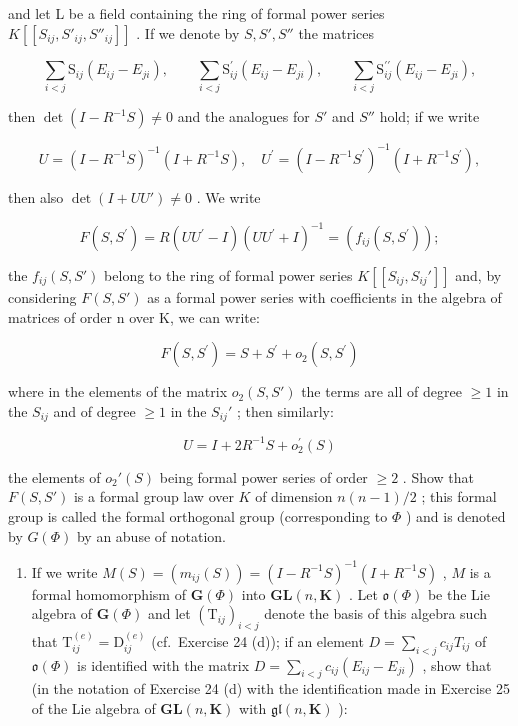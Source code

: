 and let L be a field containing the ring of formal power series \(K[[S_{ij}, S'_{ij}, S''_{ij}]]\) . If we denote by \(S, S', S''\) the matrices

\[
\sum_ {i <   j} \mathrm{S} _ {i j} (E _ {i j} - E _ {j i}), \qquad \sum_ {i <   j} \mathrm{S} _ {i j} ^ {\prime} (E _ {i j} - E _ {j i}), \qquad \sum_ {i <   j} \mathrm{S} _ {i j} ^ {\prime \prime} (E _ {i j} - E _ {j i}),
\]

then \(\operatorname{det}(I - R^{-1}S) \neq 0\) and the analogues for \(S'\) and \(S''\) hold; if we write

\[
U = (I - R ^ {- 1} S) ^ {- 1} (I + R ^ {- 1} S), \quad U ^ {\prime} = (I - R ^ {- 1} S ^ {\prime}) ^ {- 1} (I + R ^ {- 1} S ^ {\prime}),
\]

then also \(\operatorname{det}(I + UU') \neq 0\) . We write

\[
F (S, S ^ {\prime}) = R \left(U U ^ {\prime} - I\right) \left(U U ^ {\prime} + I\right) ^ {- 1} = \left(f _ {i j} \left(S, S ^ {\prime}\right)\right);
\]

the \(f_{ij}(S, S')\) belong to the ring of formal power series \(K[[S_{ij}, S_{ij}']]\) and, by considering \(F(S, S')\) as a formal power series with coefficients in the algebra of matrices of order n over K, we can write:

\[
F (S, S ^ {\prime}) = S + S ^ {\prime} + o _ {2} (S, S ^ {\prime})
\]

where in the elements of the matrix \(o_2(S, S')\) the terms are all of degree \(\geqslant 1\) in the \(S_{ij}\) and of degree \(\geqslant 1\) in the \(S_{ij}'\) ; then similarly:

\[
U = I + 2 R ^ {- 1} S + o _ {2} ^ {\prime} (S)
\]

the elements of \(o_2'(S)\) being formal power series of order \(\geqslant 2\) . Show that \(F(S, S')\) is a formal group law over \(K\) of dimension \(n(n - 1)/2\) ; this formal group is called the formal orthogonal group (corresponding to \(\Phi\) ) and is denoted by \(G(\Phi)\) by an abuse of notation.

\begin{enumerate}
\def\labelenumi{(\alph{enumi})}
\setcounter{enumi}{1}
\tightlist
\item
  If we write \(M(S) = (m_{ij}(S)) = (I - R^{-1}S)^{-1}(I + R^{-1}S)\) , \(M\) is a formal homomorphism of \(\mathbf{G}(\Phi)\) into \(\mathbf{GL}(n, \mathbf{K})\) . Let \(\mathfrak{o}(\Phi)\) be the Lie algebra of \(\mathbf{G}(\Phi)\) and let \((\mathrm{T}_{ij})_{i < j}\) denote the basis of this algebra such that \(\mathrm{T}_{ij}^{(e)} = \mathrm{D}_{ij}^{(e)}\) (cf.~Exercise 24 (d)); if an element \(D = \sum_{i < j} c_{ij} T_{ij}\) of \(\mathfrak{o}(\Phi)\) is identified with the matrix \(D = \sum_{i < j} c_{ij}(E_{ij} - E_{ji})\) , show that (in the notation of Exercise 24 (d) with the identification made in Exercise 25 of the Lie algebra of \(\mathbf{GL}(n, \mathbf{K})\) with \(\mathfrak{gl}(n, \mathbf{K})\) ):
\end{enumerate}

